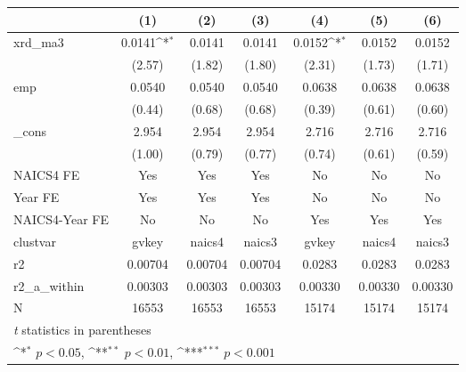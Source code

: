 {
\def\sym#1{\ifmmode^{#1}\else\(^{#1}\)\fi}
\begin{tabular}{l*{6}{c}}
\hline\hline
            &\multicolumn{1}{c}{(1)}         &\multicolumn{1}{c}{(2)}         &\multicolumn{1}{c}{(3)}         &\multicolumn{1}{c}{(4)}         &\multicolumn{1}{c}{(5)}         &\multicolumn{1}{c}{(6)}         \\
\hline
xrd\_ma3     &      0.0141\sym{*}  &      0.0141         &      0.0141         &      0.0152\sym{*}  &      0.0152         &      0.0152         \\
            &      (2.57)         &      (1.82)         &      (1.80)         &      (2.31)         &      (1.73)         &      (1.71)         \\
[1em]
emp         &      0.0540         &      0.0540         &      0.0540         &      0.0638         &      0.0638         &      0.0638         \\
            &      (0.44)         &      (0.68)         &      (0.68)         &      (0.39)         &      (0.61)         &      (0.60)         \\
[1em]
\_cons      &       2.954         &       2.954         &       2.954         &       2.716         &       2.716         &       2.716         \\
            &      (1.00)         &      (0.79)         &      (0.77)         &      (0.74)         &      (0.61)         &      (0.59)         \\
[1em]
NAICS4 FE   &         Yes         &         Yes         &         Yes         &          No         &          No         &          No         \\
[1em]
Year FE     &         Yes         &         Yes         &         Yes         &          No         &          No         &          No         \\
[1em]
NAICS4-Year FE&          No         &          No         &          No         &         Yes         &         Yes         &         Yes         \\
\hline
clustvar    &       gvkey         &      naics4         &      naics3         &       gvkey         &      naics4         &      naics3         \\
r2          &     0.00704         &     0.00704         &     0.00704         &      0.0283         &      0.0283         &      0.0283         \\
r2\_a\_within &     0.00303         &     0.00303         &     0.00303         &     0.00330         &     0.00330         &     0.00330         \\
N           &       16553         &       16553         &       16553         &       15174         &       15174         &       15174         \\
\hline\hline
\multicolumn{7}{l}{\footnotesize \textit{t} statistics in parentheses}\\
\multicolumn{7}{l}{\footnotesize \sym{*} \(p<0.05\), \sym{**} \(p<0.01\), \sym{***} \(p<0.001\)}\\
\end{tabular}
}
